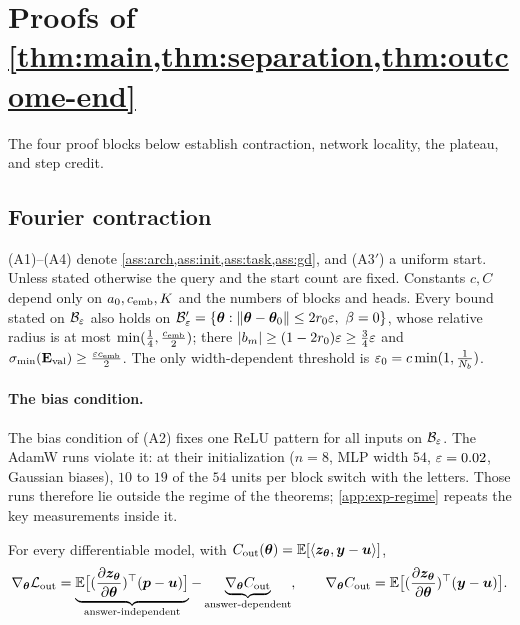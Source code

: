 \section{Proofs of \texorpdfstring{\cref{thm:main,thm:separation,thm:outcome-end}}{Theorems 1-3}}
\label{app:damping-proof}
\label{app:mainproofs}

The four proof blocks below establish contraction, network locality, the plateau, and step credit.

\subsection{Fourier contraction}
\label{app:C-fourier}
\label{app:assumptions}




(A1)--(A4) denote \cref{ass:arch,ass:init,ass:task,ass:gd}, and (A3$'$) a uniform start. Unless stated otherwise the query and the start
count are fixed. Constants $c,C$ depend only on $a_0,c_{\mathrm{emb}},K$ and the numbers of blocks and heads. Every bound stated on $\mathcal B_{\varepsilon}$ also
holds on $\initball'=\{\bm\theta:\|\bm\theta-\bm\theta_0\|\le2\ballradius\initscale,\ \beta=0\}$, whose relative radius is at most $\min(\frac{1}{4},\frac{c_{\mathrm{emb}}}{2})$; there
$|b_m|\ge(1-2r_0)\varepsilon\ge\frac{3}{4}\varepsilon$ and $\sigma_{\min}(\mathbf E_{\mathrm{val}})\ge\frac{\varepsilon c_{\mathrm{emb}}}{2}$. The only width-dependent threshold is $\varepsilon_0=c\min(1,\frac{1}{N_b})$.

\paragraph{The bias condition.}\label{rem:two-block-bias} The bias condition of (A2) fixes one ReLU pattern for all inputs on $\mathcal B_{\varepsilon}$. The AdamW runs violate it: at their initialization
($n=8$, MLP width $54$, $\varepsilon=0.02$, Gaussian biases), $10$ to $19$ of the $54$ units per block switch with the letters. Those
runs therefore lie outside the regime of the theorems; \cref{app:exp-regime} repeats the key measurements inside it.


\begin{lemma}
\label{lem:gradient-split}
For every differentiable model, with $C_{\mathrm{out}}(\bm\theta)=\mathbb E[\langle\bm z_{\bm\theta},\bm y-\bm u\rangle]$,
\[
 \nabla_{\bm\theta}\Lout=\underbrace{\E\bigl[(\Jz)^\top(\bm p-\bm u)\bigr]}_{\text{answer-independent}}-\underbrace{\nabla_{\bm\theta}\outcredit}_{\text{answer-dependent}},\qquad
 \nabla_{\bm\theta}\outcredit=\E\bigl[(\Jz)^\top(\bm y-\bm u)\bigr].
\]
\end{lemma}

